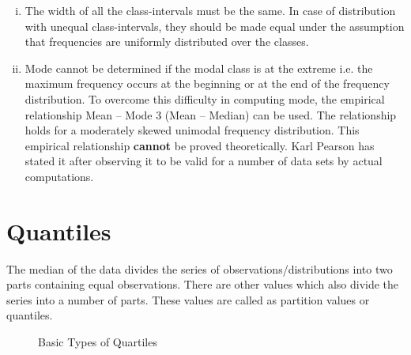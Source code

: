 \documentclass[
10pt, %
a4paper, %
]{report}
\begin{document}
\begin{description}
\begin{enumerate}[Step 1.]
\begin{enumerate}[i.]
\item The width of all the class-intervals must be the same. In case of distribution with unequal class-intervals, they should be made equal under the assumption that frequencies are uniformly distributed over the classes.
\item Mode cannot be determined if the modal class is at the extreme i.e. the maximum frequency occurs at the beginning or at the end of the frequency distribution. To overcome this difficulty in computing mode, the empirical relationship Mean – Mode 3 (Mean – Median) can be used. The relationship holds for a moderately skewed unimodal
frequency distribution. This empirical relationship \textbf{cannot} be proved theoretically. Karl Pearson has stated it after observing it to be valid for a number of data sets by actual computations.
\end{enumerate}
\end{enumerate}
\end{description}

\section{Quantiles}
The median of the data divides the series of observations/distributions into two parts containing equal observations. There are other values which also divide the series into a number of parts. These values are called as partition values or quantiles.
	
\begin{figure}[h!]
\centering
{}
\caption{Basic Types of Quartiles}
\label{fig:quartiletypes}
\end{figure}
\end{document}
